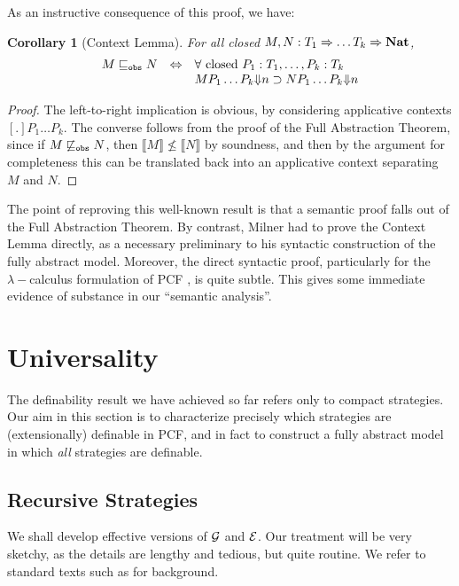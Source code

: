 \documentclass[11pt]{article}
\newtheorem{corollary}[theorem]{Corollary}
\newcommand{\E}{{\cal E}}
\newcommand{\G}{{\cal G}}
\newcommand{\Nat}{{\bf Nat}}
\begin{document}
As an instructive consequence of this proof, we have:

\begin{corollary}[Context Lemma]
For all closed $M,N:T_1\Rightarrow \dots T_k\Rightarrow \Nat$,
\[
\begin{array}{lcl}
M\sqsubseteq_{\tt obs} N & \Leftrightarrow & \forall \mbox{ closed }
P_1:T_1,\dots,P_k:T_k \\
& & MP_1\dots P_k{\Downarrow} n\supset NP_1\dots P_k{\Downarrow} n
\end{array}
\]
\end{corollary}
\begin{proof} The left-to-right implication is obvious, by
considering applicative contexts $[.] P_1\dots P_k$. The converse
follows from the proof of the Full Abstraction Theorem, since if
$M\not\sqsubseteq_{\tt obs} N$, then $\llbracket M\rrbracket \nleq
\llbracket N\rrbracket$ by soundness, and then by the argument for
completeness this can be translated back into an applicative
context separating $M$ and $N$.
\end{proof}

The point of reproving this well-known result is that a semantic proof
falls out of the Full Abstraction Theorem. By contrast, Milner had to prove
the Context Lemma directly, as a necessary preliminary to his syntactic
construction of the fully abstract model. Moreover, the direct syntactic
proof, particularly for the $\lambda-$calculus formulation of PCF
\cite{CurienPL:catcsa}, is quite subtle. This gives some immediate
evidence of substance in our ``semantic analysis''.




\section{Universality}

The definability result we have achieved so far refers only to compact
strategies. Our aim in this section is to characterize precisely which
strategies are (extensionally) definable in PCF, and in fact to
construct a fully abstract model in which {\em all} strategies are
definable.

\subsection{ Recursive Strategies}

We shall develop effective versions of $\G$ and $\E$. Our treatment will be
very sketchy, as the details are lengthy and tedious, but quite routine.
We refer to standard texts such as \cite{SoareRI:recesd} for background.
\end{document}
